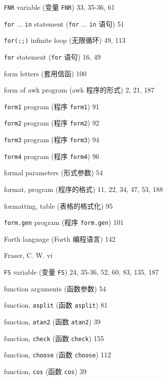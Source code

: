 \begin{multicols}{2}
\hangindent=2pc  \verb'FNR' variable (变量 \verb'FNR') 33, 35-36, 61

\hangindent=2pc  \verb'for' ... \verb'in' statement (\verb'for'
... \verb'in' 语句) 51

\hangindent=2pc  \verb'for(;;)' infinite loop (无限循环) 49, 113

\hangindent=2pc  \verb'for' statement (\verb'for' 语句) 16, 49

\hangindent=2pc  form letters (套用信函) 100

\hangindent=2pc  form of awk program (awk 程序的形式) 2, 21, 187

\hangindent=2pc  \verb'form1' program (程序 \verb'form1') 91

\hangindent=2pc  \verb'form2' program (程序 \verb'form2') 92

\hangindent=2pc  \verb'form3' program (程序 \verb'form3') 94

\hangindent=2pc  \verb'form4' program (程序 \verb'form4') 96

\hangindent=2pc  formal parameters (形式参数) 54

\hangindent=2pc  format, program (程序的格式)
11, 22, 34, 47, 53, 188

\hangindent=2pc  formatting, table (表格的格式化) 95

\hangindent=2pc  \verb'form.gen' program (程序 \verb'form.gen') 101

\hangindent=2pc  Forth language (Forth 编程语言) 142

\hangindent=2pc  Fraser, C. W. vi

\hangindent=2pc  \verb'FS' variable (变量 \verb'FS')
24, 35-36, 52, 60, 83, 135, 187

\hangindent=2pc  function arguments (函数参数) 54

\hangindent=2pc  function, \verb'asplit' (函数 \verb'asplit') 81

\hangindent=2pc  function, \verb'atan2' (函数 \verb'atan2') 39

\hangindent=2pc  function, \verb'check' (函数 \verb'check') 155

\hangindent=2pc  function, \verb'choose' (函数 \verb'choose') 112

\hangindent=2pc  function, \verb'cos' (函数 \verb'cos') 39


\end{multicols}
